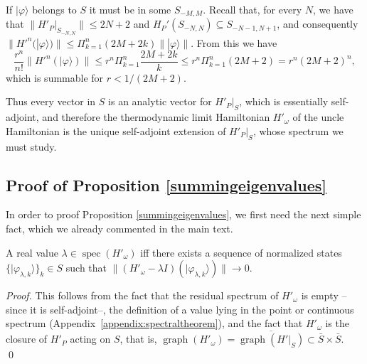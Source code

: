 \documentclass[cmp]{svjour}
\newcommand{\w}{\omega}
\DeclareMathOperator{\graph}{graph}
\newcommand{\ket}[1]{|#1\rangle}
\DeclareMathOperator{\spec}{spec}
\begin{document}
If $\ket{\varphi}$ belongs to $S$ it must be in some $S_{-M,M}$. Recall that, for every $N$, we have that $\|H'_P|_{S_{-N,N}}\|\le 2N+2$ and $H_P'(S_{-N,N})\subseteq S_{-N-1,N+1}$, and consequently $\|H'^n(\ket{\varphi})\|\le \Pi_{k=1}^n(2M+2k)\|\ket{\varphi}\|$. From this we have
\[
    \frac{r^n}{n!}\|H'^n(\ket{\varphi})\|\le{r^n}\Pi_{k=1}^n\frac{2M+2k}{k}\le r^n \Pi_{k=1}^n (2M+2)=r^n(2M+2)^n,
\]
which is summable for $r<1/(2M+2)$.

Thus every vector in $S$ is an analytic vector for $H'_P|_S$, which is essentially self-adjoint, and therefore the thermodynamic limit Hamiltonian $H'_\w$ of the uncle Hamiltonian is the unique self-adjoint extension of $H'_P|_S$, whose spectrum we must study.









\subsection*{Proof of Proposition \ref{summingeigenvalues}}

In order to proof Proposition \ref{summingeigenvalues}, we first need the next simple fact, which we already commented in the main text.


\begin{proposition} \label{prop:finitelysupportedWeylseqs} A real value $\lambda\in \spec(H'_\w)$ iff there exists a sequence of normalized states   $\{\ket{\varphi_{\lambda,k} } \} _k\in S$ such that $\|(H'_\w -\lambda I ) (\ket{\varphi_{\lambda,k}}) \|\to 0$.

\end{proposition}

\begin{proof}
    This follows from the fact that the residual spectrum of $H'_\w$ is empty --since it is self-adjoint--, the definition of a value lying in the point or continuous spectrum (Appendix~\ref{appendix:spectraltheorem}), and the fact that $H'_\w$ is the closure of $H'_P$ acting on $S$, that is, $\graph(H'_\w)=\overline{\graph(H'{|_S})}\subset \bar S\times\bar S$.
    \hspace*{\fill}\qed
\end{proof}
\end{document}
